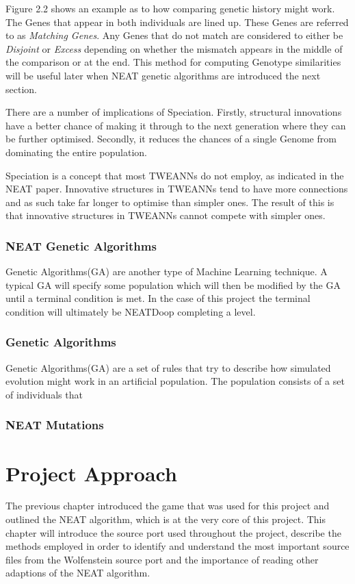\documentclass[]{Learning-to-Play-Wolfenstein-thesis}
\begin{document}
Figure 2.2 shows an example as to how comparing genetic history might work. The Genes that appear in both individuals are lined up. These Genes are referred to as \textit{Matching Genes}. Any Genes that do not match are considered to either be \textit{Disjoint} or \textit{Excess} depending on whether the mismatch appears in the middle of the comparison or at the end. This method for computing Genotype similarities will be useful later when NEAT genetic algorithms are introduced the next section.

There are a number of implications of Speciation. Firstly, structural innovations have a better chance of making it through to the next generation where they can be further optimised. Secondly, it reduces the chances of a single Genome from dominating the entire population. 

Speciation is a concept that most TWEANNs do not employ, as indicated in the NEAT paper. Innovative structures in TWEANNs tend to have more connections and as such take far longer to optimise than simpler ones. The result of this is that innovative structures in TWEANNs cannot compete with simpler ones.

\subsection{\label{section2.5}NEAT Genetic Algorithms}
Genetic Algorithms(GA) are another type of Machine Learning technique. A typical GA will specify some population which will then be modified by the GA until a terminal condition is met. In the case of this project the terminal condition will ultimately be NEATDoop completing a level.

\subsection{Genetic Algorithms}
Genetic Algorithms(GA) are a set of rules that try to describe how simulated evolution might work in an artificial population. The population consists of a set of individuals that 
\subsection{NEAT Mutations}


\chapter{\label{Chapter3}Project Approach}%
The previous chapter introduced the game that was used for this project and outlined the NEAT algorithm, which is at the very core of this project. This chapter will introduce the source port used throughout the project, describe the methods employed in order to identify and understand the most important source files from the Wolfenstein source port and the importance of reading other adaptions of the NEAT algorithm.
\end{document}
